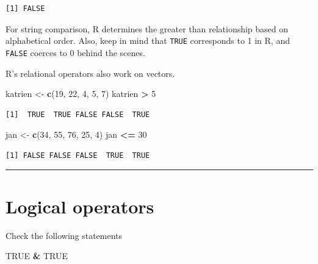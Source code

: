 \documentclass[
]{book}
\newenvironment{Shaded}{\begin{snugshade}}{\end{snugshade}}
\newcommand{\DecValTok}[1]{\textcolor[rgb]{0.00,0.00,0.81}{#1}}
\newcommand{\KeywordTok}[1]{\textcolor[rgb]{0.13,0.29,0.53}{\textbf{#1}}}
\newcommand{\NormalTok}[1]{#1}
\newcommand{\OperatorTok}[1]{\textcolor[rgb]{0.81,0.36,0.00}{\textbf{#1}}}
\newcommand{\OtherTok}[1]{\textcolor[rgb]{0.56,0.35,0.01}{#1}}
\newcommand{\StringTok}[1]{\textcolor[rgb]{0.31,0.60,0.02}{#1}}
\begin{document}
\begin{verbatim}
[1] FALSE
\end{verbatim}

For string comparison, R determines the greater than relationship based on alphabetical order. Also, keep in mind that \texttt{TRUE} corresponds to 1 in R, and \texttt{FALSE} coerces to 0 behind the scenes.

R's relational operators also work on vectors.

\begin{Shaded}
\begin{Highlighting}[]
\NormalTok{katrien <-}\StringTok{ }\KeywordTok{c}\NormalTok{(}\DecValTok{19}\NormalTok{, }\DecValTok{22}\NormalTok{, }\DecValTok{4}\NormalTok{, }\DecValTok{5}\NormalTok{, }\DecValTok{7}\NormalTok{)}
\NormalTok{katrien }\OperatorTok{>}\StringTok{ }\DecValTok{5}
\end{Highlighting}
\end{Shaded}

\begin{verbatim}
[1]  TRUE  TRUE FALSE FALSE  TRUE
\end{verbatim}

\begin{Shaded}
\begin{Highlighting}[]
\NormalTok{jan <-}\StringTok{ }\KeywordTok{c}\NormalTok{(}\DecValTok{34}\NormalTok{, }\DecValTok{55}\NormalTok{, }\DecValTok{76}\NormalTok{, }\DecValTok{25}\NormalTok{, }\DecValTok{4}\NormalTok{)}
\NormalTok{jan }\OperatorTok{<=}\StringTok{ }\DecValTok{30}
\end{Highlighting}
\end{Shaded}

\begin{verbatim}
[1] FALSE FALSE FALSE  TRUE  TRUE
\end{verbatim}

\begin{center}\rule{0.5\linewidth}{0.5pt}\end{center}

\hypertarget{logical-operators}{%
\section{Logical operators}\label{logical-operators}}

Check the following statements

\begin{Shaded}
\begin{Highlighting}[]
\OtherTok{TRUE} \OperatorTok{&}\StringTok{ }\OtherTok{TRUE}
\end{Highlighting}
\end{Shaded}
\end{document}
